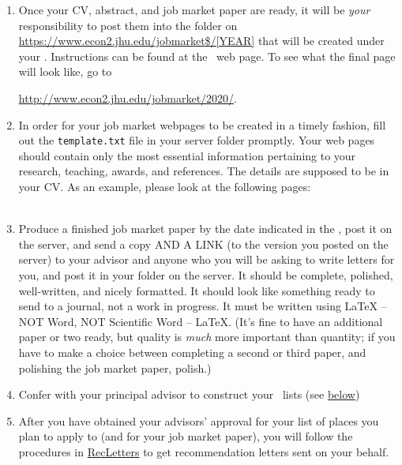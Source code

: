 \documentclass{\classes/econtex}
\begin{document}
\begin{enumerate}
  \hypertarget{Post-To-Server}{}
\item Once your CV, abstract, and job market paper are ready, it will
  be \textit{your} responsibility to post them into the folder
  on \url{https://www.econ2.jhu.edu/jobmarket$/[YEAR]} that will be created under your \Moniker.
  Instructions can be found at the~{\JMPHLink} web page.  To see what
  the final page will look like, go to
  
  \url{http://www.econ2.jhu.edu/jobmarket/2020/}.
  
  \hypertarget{Template}{}
\item In order for your job market webpages to be created in a timely fashion, 
  fill out the \texttt{template.txt} file in your server folder promptly.
  Your web pages should contain only the most essential information 
  pertaining to your research, teaching, awards, and references. 
  The details are supposed to be in your CV.
  As an example, please look at the following pages:\\
  \\
  

  \hypertarget{Produce-Job-Paper}{}
\item Produce a finished job market paper by the date indicated in the \timet, post it on the server, and send a copy AND A LINK (to the version you posted on the server) to your advisor and anyone who you will be asking to write letters for you, and post it in your folder on the server.  It should be complete, polished, well-written, and nicely formatted.  It should look like something ready to send to a journal, not a work in progress.  It must be written using {\LaTeX} -- NOT Word, NOT Scientific Word -- {\LaTeX}.  (It's fine to have an additional paper or two ready, but quality is \textit{much} more important than quantity; if you have to make a choice between completing a second or third paper, and polishing the job market paper, polish.)
  
  \hypertarget{\EM}{}
\item Confer with your principal advisor to construct your~{\EMtt} lists (see \hyperlink{below}{below})
  
  \hypertarget{Rec-Letters}{}
\item After you have obtained your advisors' approval for your list of
  places you plan to apply to (and for your job market paper), you
  will follow the procedures in \href{\pageurl/RecLetters}{RecLetters} 
  to get recommendation letters sent on your behalf.


\end{enumerate}
\end{document}
